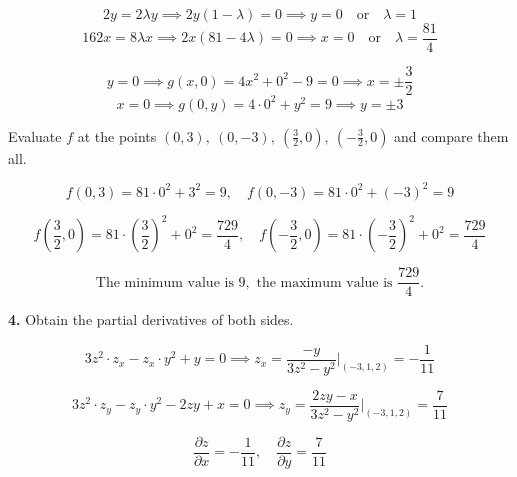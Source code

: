 \documentclass{article}
\begin{document}
\[2y=2\lambda y\implies 2y(1-\lambda)=0\implies y=0\quad\text{or}\quad\lambda=1\]
\[162x=8\lambda x\implies 2x(81-4\lambda)=0\implies x=0\quad\text{or}\quad\lambda=\frac{81}4\]

\[y=0\implies g(x,0)=4x^2+0^2-9=0\implies x=\pm\frac32\]
\[x=0\implies g(0,y)=4\cdot0^2+y^2=9\implies y=\pm3\]

Evaluate $f$ at the points $\displaystyle(0,3),\:(0,-3),\:\left(\frac32,0\right),\:\left(-\frac32,0\right)$ and compare them all.

\[f\left(0,3\right)=81\cdot0^2+3^2=9,\quad f\left(0,-3\right)=81\cdot0^2+(-3)^2=9\]

\[f\left(\frac32,0\right)=81\cdot\left(\frac32\right)^2+0^2=\frac{729}4,\quad f\left(-\frac32,0\right)=81\cdot\left(-\frac32\right)^2+0^2=\frac{729}4\]

\[\boxed{\text{The minimum value is }9,\text{ the maximum value is }\frac{729}4.}\]

\vspace{1em}

\textbf{4.} Obtain the partial derivatives of both sides.

\[3z^2\cdot z_x-z_x\cdot y^2+y=0\implies z_x=\frac{-y}{3z^2-y^2}\bigg|_{(-3,1,2)}=-\frac1{11}\]

\[3z^2\cdot z_y-z_y\cdot y^2-2zy+x=0\implies z_y=\frac{2zy-x}{3z^2-y^2}\bigg|_{(-3,1,2)}=\frac7{11}\]

\[\boxed{\frac{\partial z}{\partial x}=-\frac1{11},\quad\frac{\partial z}{\partial y}=\frac7{11}}\]

\vspace{1em}
\end{document}
